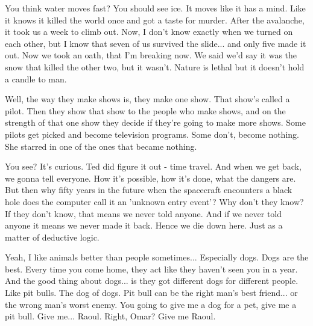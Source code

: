 \documentclass{book}
\begin{document}
You think water moves fast? You should see ice. It moves like it has a mind. Like it knows it killed the world once and got a taste for murder. After the avalanche, it took us a week to climb out. Now, I don't know exactly when we turned on each other, but I know that seven of us survived the slide... and only five made it out. Now we took an oath, that I'm breaking now. We said we'd say it was the snow that killed the other two, but it wasn't. Nature is lethal but it doesn't hold a candle to man.

Well, the way they make shows is, they make one show. That show's called a pilot. Then they show that show to the people who make shows, and on the strength of that one show they decide if they're going to make more shows. Some pilots get picked and become television programs. Some don't, become nothing. She starred in one of the ones that became nothing.

You see? It's curious. Ted did figure it out - time travel. And when we get back, we gonna tell everyone. How it's possible, how it's done, what the dangers are. But then why fifty years in the future when the spacecraft encounters a black hole does the computer call it an 'unknown entry event'? Why don't they know? If they don't know, that means we never told anyone. And if we never told anyone it means we never made it back. Hence we die down here. Just as a matter of deductive logic.

Yeah, I like animals better than people sometimes... Especially dogs. Dogs are the best. Every time you come home, they act like they haven't seen you in a year. And the good thing about dogs... is they got different dogs for different people. Like pit bulls. The dog of dogs. Pit bull can be the right man's best friend... or the wrong man's worst enemy. You going to give me a dog for a pet, give me a pit bull. Give me... Raoul. Right, Omar? Give me Raoul.
\end{document}
